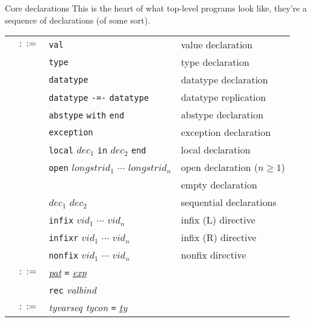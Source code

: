 \begin{grammar}{Core declarations}
This is the heart of what top-level programs look like, they're a
sequence of declarations (of some sort).
\begin{longtable}{rcll}
\label{grammar:dec}\nonterminal{dec} & $::=$ & \texttt{val}
\nonterminal{tyvarseq} \nonterminal{valbind} & value declaration\\
&\alt&\texttt{type} \nonterminal{typbind} & type declaration\\
&\alt&\texttt{datatype} \nonterminal{datbind} & datatype declaration\\
&\alt&\texttt{datatype} \nonterminal{tycon} \texttt{-=-} \texttt{datatype} \nonterminal{longtycon}
& datatype replication\\
&\alt&\texttt{abstype} \nonterminal{datbind} \texttt{with} \nonterminal{dec} \texttt{end} &
abstype declaration\\
&\alt&\texttt{exception} \nonterminal{exbind} & exception declaration\\
&\alt&\texttt{local} $dec_{1}$ \texttt{in} $dec_{2}$ \texttt{end} &
local declaration\\
&\alt&\texttt{open} $longstrid_{1}$ $\cdots$ $longstrid_{n}$ & open
declaration ($n\geq1$)\\
&\alt&&empty declaration\\
&\alt&$dec_{1}$ \optional{\texttt{;}} $dec_{2}$ & sequential declarations\\
&\alt&\texttt{infix} \optional{\textit{d}} $vid_{1}$ $\cdots$ $vid_{n}$
&infix (L) directive\\
&\alt&\texttt{infixr} \optional{\textit{d}} $vid_{1}$ $\cdots$ $vid_{n}$
&infix (R) directive\\
&\alt&\texttt{nonfix} \optional{\textit{d}} $vid_{1}$ $\cdots$ $vid_{n}$
&nonfix directive\\
\label{grammar:valbind}\nonterminal{valbind} & $::=$ & \hyperref[grammar:pat]{\textit{pat}}
\texttt{=} \hyperref[grammar:exp]{\textit{exp}} \optional{\texttt{and} \textit{valbind}}\\
&\alt&\texttt{rec} \textit{valbind}\\
\label{grammar:typbind}\nonterminal{typbind} & $::=$ &
\textit{tyvarseq tycon} \texttt{=} \hyperref[grammar:ty]{\textit{ty}} \optional{\texttt{and} \textit{typbind}}\\

\end{longtable}
\end{grammar}
